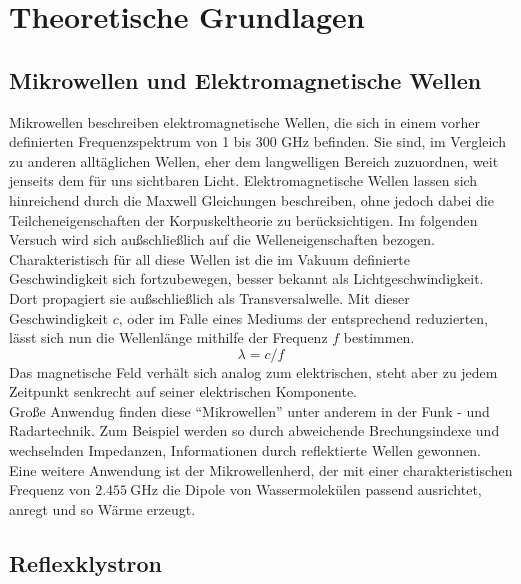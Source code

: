 \section{Theoretische Grundlagen}

\subsection{Mikrowellen und Elektromagnetische Wellen }
Mikrowellen beschreiben elektromagnetische Wellen, die sich in einem vorher definierten Frequenzspektrum von 1 bis 300 $\si{\giga\hertz}$ befinden. 
Sie sind, im Vergleich zu anderen alltäglichen Wellen, eher dem langwelligen Bereich zuzuordnen, weit jenseits dem für uns sichtbaren Licht.
Elektromagnetische Wellen lassen sich hinreichend durch die Maxwell Gleichungen beschreiben, ohne jedoch dabei die Teilcheneigenschaften der Korpuskeltheorie zu berücksichtigen. Im folgenden Versuch wird sich außschließlich auf die Welleneigenschaften bezogen.
Charakteristisch für all diese Wellen ist die im Vakuum definierte Geschwindigkeit sich fortzubewegen, besser bekannt als Lichtgeschwindigkeit. Dort propagiert sie außschließlich als Transversalwelle.
Mit dieser Geschwindigkeit $c$, oder im Falle eines Mediums der entsprechend reduzierten, lässt sich nun die Wellenlänge mithilfe der Frequenz $f$ bestimmen.
\begin{equation*}
    \label{eqn:1}
\lambda = c/f
\end{equation*}
Das magnetische Feld verhält sich analog zum elektrischen, steht aber zu jedem Zeitpunkt senkrecht auf seiner elektrischen Komponente. \\
\newline
Große Anwendug finden diese \enquote{Mikrowellen} unter anderem in der Funk - und Radartechnik. Zum Beispiel werden so durch abweichende Brechungsindexe und wechselnden Impedanzen,  Informationen durch reflektierte Wellen gewonnen. 
Eine weitere Anwendung ist der Mikrowellenherd, der mit einer charakteristischen Frequenz von $\SI{2.455}{\giga\hertz}$ die Dipole von Wassermolekülen passend ausrichtet, anregt und so Wärme erzeugt.

\subsection{Reflexklystron}

